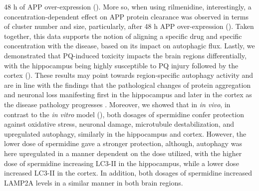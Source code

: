 48 h of APP over-expression (). More so, when using rilmenidine, interestingly, a concentration-dependent effect on APP protein clearance was observed in terms of  cluster number and size, particularly, after 48 h APP over-expression (). Taken together, this data supports the notion of  aligning a specific drug and specific concentration with the disease, based on its impact on autophagic flux. Lastly, we demonstrated that PQ-induced toxicity impacts the brain regions differentially, with the hippocampus being highly susceptible to PQ injury followed by the cortex (). These results may point towards region-specific autophagy activity and are in line with the findings that the pathological changes of protein aggregation and neuronal loss manifesting first in the hippocampus and later in the cortex as the disease pathology progresses \citep{Braak2004,Braak1998,Braak1991,Braak2012}. Moreover, we showed that in \textit{in vivo}, in contrast to the \textit{in vitro} model (), both dosages of spermidine confer protection against oxidative stress, neuronal damage, microtubule destabilization, and upregulated autophagy, similarly in the hippocampus and cortex. However, the lower dose of spermidine gave a stronger protection, although, autophagy was here upregulated in a manner dependent on the dose utilized, with the higher dose of spermidine increasing LC3-II in the hippocampus, while a lower dose increased LC3-II in the cortex. In addition, both dosages of spermidine increased LAMP2A levels in a similar manner in both brain regions. 


